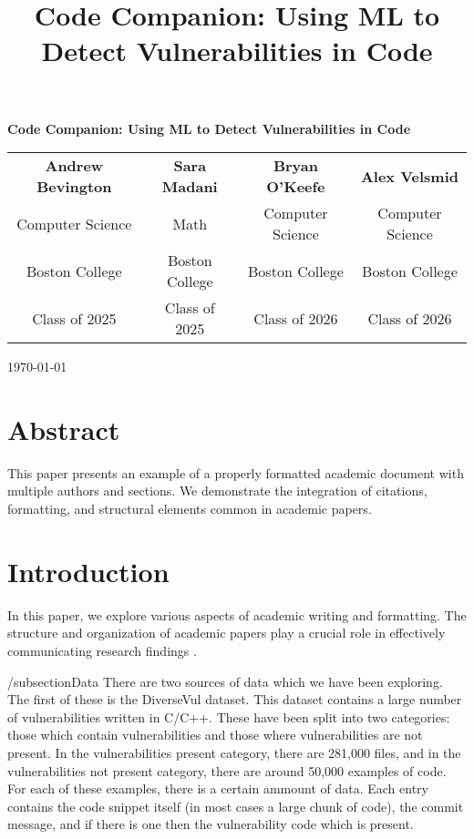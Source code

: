 \documentclass{article}
\title{\Large\textbf{Code Companion: Using ML to Detect Vulnerabilities in Code}}
\date{}  %
\begin{document}
\begin{titlepage}
\begin{center}
\vspace*{2cm}
{\huge\textbf{Code Companion: Using ML to Detect Vulnerabilities in Code}\par}
\vspace{2cm}

\begin{tabular*}{\textwidth}{@{\extracolsep{\fill}} *{4}{c}}
    \textbf{Andrew Bevington} & \textbf{Sara Madani} & \textbf{Bryan O'Keefe} & \textbf{Alex Velsmid} \\[0.3cm]
    Computer Science & Math & Computer Science & Computer Science \\[0.2cm]
    Boston College & Boston College & Boston College & Boston College \\[0.2cm]
    Class of 2025 & Class of 2025 & Class of 2026 & Class of 2026 \\
\end{tabular*}

\vfill
\today
\end{center}
\end{titlepage}


\section*{Abstract}
This paper presents an example of a properly formatted academic document with multiple authors and sections. We demonstrate the integration of citations, formatting, and structural elements common in academic papers.

\section{Introduction}
In this paper, we explore various aspects of academic writing and formatting. The structure and organization of academic papers play a crucial role in effectively communicating research findings \cite{Abril07}. 


/subsection{Data}
There are two sources of data which we have been exploring. The first of these is the 
DiverseVul dataset. This dataset contains a large number of vulnerabilities written in C/C++.
These have been split into two categories: those which contain vulnerabilities and those
where vulnerabilities are not present. In the vulnerabilities present category, there are 
281,000 files, and in the vulnerabilities not present category, there are around 50,000
examples of code. For each of these examples, there is a certain ammount of data. Each entry
contains the code snippet itself (in most cases a large chunk of code), the commit message, and if there is one then the vulnerability code which is present. 

\end{document}
